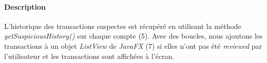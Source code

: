 \paragraph{Description} L'historique des transactions suspectes est récupéré en utilisant la méthode \emph{getSuspiciousHistory()} sur chaque compte (5). Avec des boucles, nous ajoutons les transactions à un objet \emph{ListView} de \emph{JavaFX} (7) si elles n'ont pas été \emph{reviewed} par l'utilisateur et les transactions sont affichées à l'écran.
